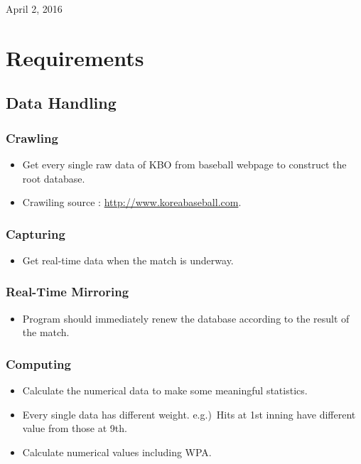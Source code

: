 \documentclass[conference,compsoc, twocolumn]{IEEEtran}
\begin{document}
\hfill April 2, 2016



\section{Requirements}



\subsection{Data Handling}


\subsubsection{Crawling}
\begin{itemize}
\item Get every single raw data of  KBO from baseball webpage to construct the root database.
\item Crawiling source : \href{http://www.koreabaseball.com}{http://www.koreabaseball.com}.
\end{itemize}

\subsubsection{Capturing}
\begin{itemize}
\item Get real-time data when the match is underway.
\end{itemize}

\subsubsection{Real-Time Mirroring}
\begin{itemize}
\item Program should immediately renew the database according to the result of the match.
\end{itemize}

\subsubsection{Computing}
\begin{itemize}
\item Calculate the numerical data to make some meaningful statistics.
\item Every single data has different weight.
e.g.)\ Hits at 1st inning have different value from those at 9th.
\item Calculate numerical values including WPA.
\end{itemize}
\end{document}
